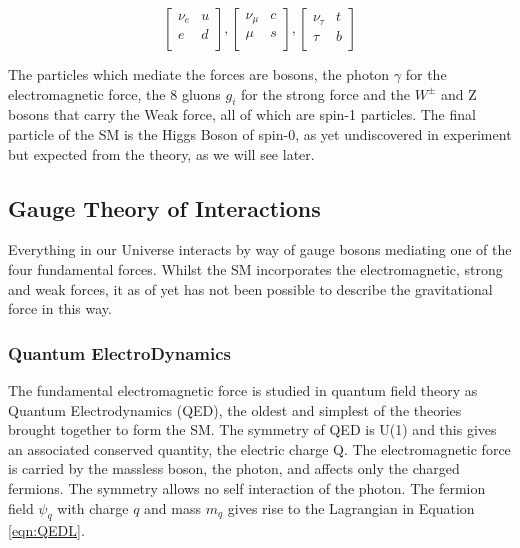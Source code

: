 \begin{equation}
\begin{bmatrix}
\nu_{e} & u \\
e & d \\
\end{bmatrix},
\begin{bmatrix}
\nu_{\mu} & c \\
\mu & s \\
\end{bmatrix},
\begin{bmatrix}
\nu_{\tau} & t \\
\tau & b\\
\end{bmatrix}
\label{eqn:threefams}
\end{equation}

The particles which mediate the forces are bosons, the photon $\gamma$ for the electromagnetic force, the 8 gluons $g_{i}$ for the strong force and the $W^{\pm}$ and Z bosons that carry the Weak force, all of which are spin-1 particles. The final particle of the SM is the Higgs Boson of spin-0, as yet undiscovered in experiment but expected from the theory, as we will see later. 

\subsection{Gauge Theory of Interactions}

Everything in our Universe interacts by way of gauge bosons mediating one of the four fundamental forces. Whilst the SM incorporates the electromagnetic, strong and weak forces, it as of yet has not been possible to describe the gravitational force in this way. 


\subsubsection{Quantum ElectroDynamics}

The fundamental electromagnetic force is studied in quantum field theory as Quantum Electrodynamics (QED), the oldest and simplest of the theories brought together to form the SM. The symmetry of QED is U(1) and this gives an associated conserved quantity, the electric charge Q. The electromagnetic force is carried by the massless boson, the photon, and affects only the charged fermions. The symmetry allows no self interaction of the photon. The fermion field $\psi_{q}$ with charge $q$ and mass $m_{q}$ gives rise to the Lagrangian in Equation \ref{eqn:QEDL}. 

